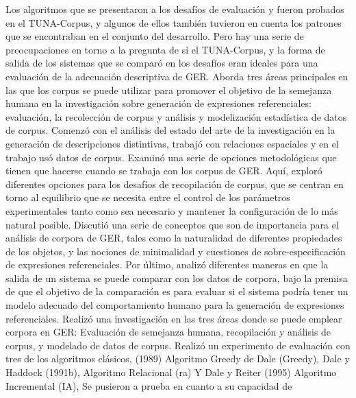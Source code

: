 Los algoritmos que se presentaron a los desaf\'ios de evaluaci\'on \cite{gatt-balz-kow:2008:ENLG} y \cite{reg2009}
fueron probados en el TUNA-Corpus, y algunos de ellos
tambi\'en tuvieron en cuenta los patrones que se encontraban en el conjunto del desarrollo. Pero hay una serie de preocupaciones en torno a la pregunta de si el TUNA-Corpus, y la forma de salida de los sistemas que se compar\'o 
en los desaf\'ios eran ideales para una evaluaci\'on de la adecuaci\'on descriptiva de GER.
Aborda tres \'areas principales en las que los corpus se puede utilizar para
promover el objetivo de la semejanza humana en la investigaci\'on sobre generaci\'on de expresiones referenciales:
evaluaci\'on, la recolecci\'on de corpus y an\'alisis y modelizaci\'on estad\'istica de
datos de corpus.
Comenz\'o con el an\'alisis del estado del arte de la investigaci\'on en
la generaci\'on de descripciones distintivas, trabaj\'o con relaciones espaciales y en el trabajo us\'o datos de corpus. Examin\'o una serie de opciones metodol\'ogicas que tienen que hacerse cuando se trabaja con los corpus de GER. Aqu\'i, explor\'o diferentes opciones para los desaf\'ios de recopilaci\'on de corpus, que se centran en torno al equilibrio que se necesita
entre el control de los par\'ametros experimentales tanto como sea necesario
y mantener la configuraci\'on de lo m\'as natural posible. Discuti\'o una serie de conceptos
que son de importancia para el an\'alisis de corpora de GER, tales como la naturalidad de diferentes
propiedades de los objetos, y las nociones de minimalidad y cuestiones de sobre-especificaci\'on de expresiones referenciales. Por \'ultimo, analiz\'o diferentes maneras en que la salida de un sistema se puede
comparar con los datos de corpora, bajo la premisa de que el objetivo de la comparaci\'on es
para evaluar si el sistema podr\'ia tener un modelo adecuado del comportamiento humano para la generaci\'on de expresiones referenciales.
Realiz\'o una investigaci\'on en las tres \'areas donde se puede emplear corpora en GER: Evaluaci\'on de semejanza humana, recopilaci\'on y an\'alisis de corpus, y modelado de datos de corpus. Realiz\'o un experimento de evaluaci\'on con tres de los algoritmos cl\'asicos, (1989) Algoritmo Greedy de Dale (Greedy), Dale y Haddock (1991b), Algoritmo Relacional (ra) Y Dale y Reiter (1995) Algoritmo Incremental (IA), Se pusieron a prueba en cuanto a su capacidad de
